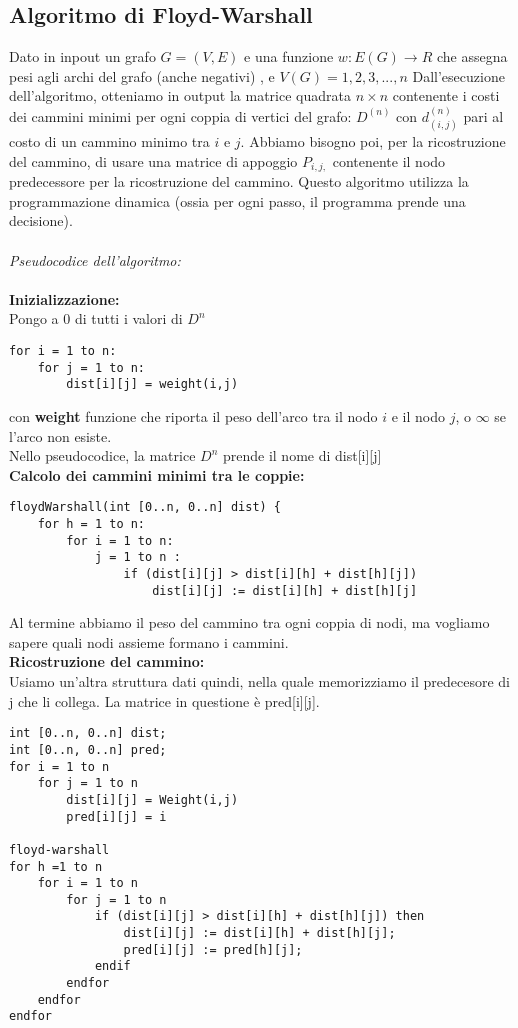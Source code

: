 \documentclass[main.tex]{subfiles}
\begin{document}
\subsection{Algoritmo di Floyd-Warshall}

Dato in inpout un grafo \(G=(V,E)\) e una funzione \(w:E(G)\to R\) che assegna pesi agli archi del grafo (anche negativi) , e \(V(G)={1,2,3,...,n}\)
Dall'esecuzione dell'algoritmo, otteniamo in output la matrice quadrata \(n \times n\) contenente i costi dei cammini minimi per ogni coppia di vertici del grafo:
\(D^{(n)}\) con \(d^{(n)}_{(i,j)}\) pari al costo di un cammino minimo tra \(i\) e  \(j\).
Abbiamo bisogno poi, per la ricostruzione del cammino, di usare una matrice di appoggio \(P_{i,j,}\) contenente  il nodo predecessore per la ricostruzione del cammino.
Questo algoritmo utilizza la programmazione dinamica (ossia per ogni passo, il programma prende una decisione).
\\
\\
\textit{Pseudocodice dell'algoritmo:}
\\
\\
\textbf{Inizializzazione:}
\\
Pongo a 0 di tutti i valori di \(D^{n}\)
\begin{lstlisting}
for i = 1 to n:
    for j = 1 to n:
        dist[i][j] = weight(i,j)
\end{lstlisting}
con \textbf{weight} funzione che riporta il peso dell'arco tra il nodo \(i\) e il nodo \(j\), o \(\infty\) se l'arco non esiste.
\\
Nello pseudocodice, la matrice \(D^{n}\) prende il nome di dist[i][j]
\\
\textbf{Calcolo dei cammini minimi tra le coppie:}
\begin{lstlisting}
floydWarshall(int [0..n, 0..n] dist) { 
	for h = 1 to n:
    	for i = 1 to n:
        	j = 1 to n :
            	if (dist[i][j] > dist[i][h] + dist[h][j])
                	dist[i][j] := dist[i][h] + dist[h][j]
\end{lstlisting}
Al termine abbiamo il peso del cammino tra ogni coppia di nodi, ma vogliamo sapere quali nodi assieme formano i cammini.
\\
\textbf{Ricostruzione del cammino:}
\\
Usiamo un'altra struttura dati quindi, nella quale memorizziamo il predecesore di j che li collega. La matrice in questione è pred[i][j].
\begin{lstlisting}
int [0..n, 0..n] dist;
int [0..n, 0..n] pred;
for i = 1 to n
    for j = 1 to n
        dist[i][j] = Weight(i,j)
        pred[i][j] = i

floyd-warshall
for h =1 to n
    for i = 1 to n
        for j = 1 to n
            if (dist[i][j] > dist[i][h] + dist[h][j]) then
                dist[i][j] := dist[i][h] + dist[h][j];
                pred[i][j] := pred[h][j];
            endif
        endfor
    endfor
endfor
\end{lstlisting}
\end{document}
